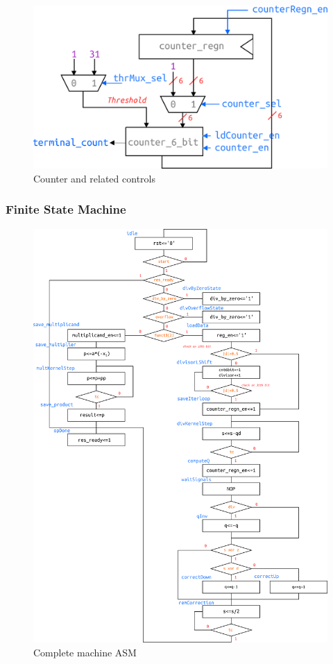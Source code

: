 \begin{figure}[H]
\centering
\includegraphics[scale=1]{pics/counter.png}
    \caption{Counter and related controls}
    \label{fig:my_label}
\end{figure}
\subsubsection{Finite State Machine}
\begin{figure}[H]
\centering
\includegraphics[scale=1]{pics/ASM.png}
    \caption{Complete machine ASM}
    \label{fig:my_label}
\end{figure}